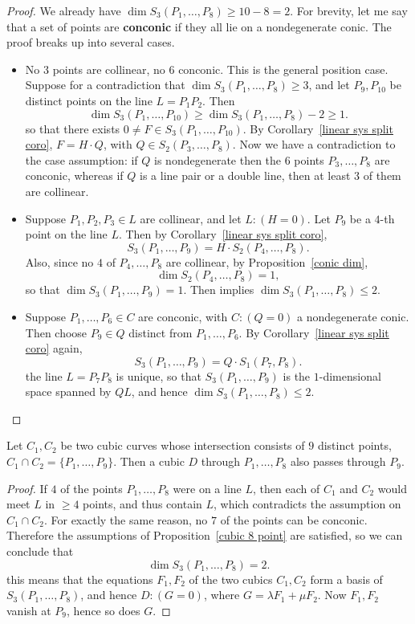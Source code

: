 \begin{proof}
We already have $\dim S_3(P_1,\dots,P_8)\geq 10-8=2$. For brevity, let me say that a set of points are \textbf{conconic} if they all lie on a nondegenerate conic. The proof breaks up into several cases.
\begin{itemize}
\item No $3$ points are collinear, no $6$ conconic. This is the general position case. Suppose for a contradiction that $\dim S_3(P_1,\dots,P_8)\geq3$, and let $P_9,P_{10}$ be distinct points on the line $L=P_1P_2$. Then
\[\dim S_3(P_1,\dots,P_{10})\geq\dim S_3(P_1,\dots,P_8)-2\geq 1.\]
so that there exists $0\neq F\in S_3(P_1,\dots,P_{10})$. By Corollary~\ref{linear sys split coro}, $F=H\cdot Q$, with $Q\in S_2(P_3,\dots,P_8)$. Now we have a contradiction to the case assumption: if $Q$ is nondegenerate then the $6$ points $P_3,\dots,P_8$ are conconic, whereas if $Q$ is a line pair or a double line, then at least $3$ of them are collinear.
\item Suppose $P_1,P_2,P_3\in L$ are collinear, and let $L:(H=0)$. Let $P_9$ be a $4$-th point on the line $L$. Then by Corollary~\ref{linear sys split coro},
\[S_3(P_1,\dots,P_9)=H\cdot S_2(P_4,\dots,P_8).\]
Also, since no $4$ of $P_4,\dots,P_8$ are collinear, by Proposition~\ref{conic dim}, 
\[\dim S_2(P_4,\dots,P_8)=1,\]
so that $\dim S_3(P_1,\dots,P_9)=1$. Then implies $\dim S_3(P_1,\dots,P_8)\leq 2$.
\item Suppose $P_1,\dots,P_6\in C$ are conconic, with $C:(Q=0)$ a nondegenerate conic. Then choose $P_9\in Q$ distinct from $P_1,\dots,P_6$. By Corollary~\ref{linear sys split coro} again,
\[S_3(P_1,\dots,P_9)=Q\cdot S_1(P_7,P_8).\]
the line $L=P_7P_8$ is unique, so that $S_3(P_1,\dots,P_9)$ is the $1$-dimensional space spanned by $QL$, and hence $\dim S_3(P_1,\dots,P_8)\leq 2$.
\end{itemize}
\end{proof}
\begin{corollary}\label{cubic 9 point}
Let $C_1,C_2$ be two cubic curves whose intersection consists of $9$ distinct points, $C_1\cap C_2=\{P_1,\dots,P_9\}$. Then a cubic $D$ through $P_1,\dots,P_8$ also passes through $P_9$.
\end{corollary}
\begin{proof}
If $4$ of the points $P_1,\dots,P_8$ were on a line $L$, then each of $C_1$ and $C_2$ would meet $L$ in $\geq4$ points, and thus contain $L$, which contradicts the assumption on $C_1\cap C_2$. For exactly the same reason, no $7$ of the points can be conconic. Therefore the assumptions of Proposition~\ref{cubic 8 point} are satisfied, so we can conclude that
\[\dim S_3(P_1,\dots,P_8)=2.\]
this means that the equations $F_1,F_2$ of the two cubics $C_1,C_2$ form a basis of $S_3(P_1,\dots,P_8)$, and hence $D:(G=0)$, where $G=\lambda F_1+\mu F_2$. Now $F_1,F_2$ vanish at $P_9$, hence so does $G$.
\end{proof}
